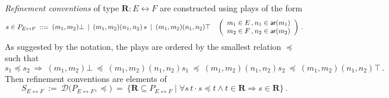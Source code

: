 \begin{definition} \label{def:refconv}
  \emph{Refinement conventions} of type $\mathbf{R} : E \leftrightarrow F$
  are constructed using plays of the form
  \[
    s \in P_{E \leftrightarrow F} \: ::= \:
    (m_1, m_2) \bot \: \mid \:
    (m_1, m_2) (n_1, n_2) \, s \: \mid \:
    (m_1, m_2) (n_1, n_2) \top
    \quad
    \left(
      \begin{array}{c@{\:}c}
        m_1 \in E \,, & n_1 \in \kw{ar}(m_1) \\
        m_2 \in F \,, & n_2 \in \kw{ar}(m_2)
      \end{array}
    \right)
    \,.
  \]
  As suggested by the notation,
  the plays are ordered by the smallest relation $\preceq$
  such that
  \[
    s_1 \preceq s_2 \:\Longrightarrow\:
    (m_1, m_2) \bot \:\preceq\:
    (m_1, m_2) (n_1, n_2) s_1 \:\preceq\:
    (m_1, m_2) (n_1, n_2) s_2 \:\preceq\:
    (m_1, m_2) (n_1, n_2) \top
    \,.
  \]
  Then refinement conventions are elements of
  \[
    S_{E \leftrightarrow F} \: := \:
    \mathcal{D} \big( P_{E \leftrightarrow F}, {\preceq} \big) \: = \:
    \{ \mathbf{R} \subseteq P_{E \leftrightarrow F} \mid
      \forall s \, t \cdot s \preceq t \wedge t \in \mathbf{R} \Rightarrow
    s \in \mathbf{R} \}
    \,.
  \]
\end{definition}

